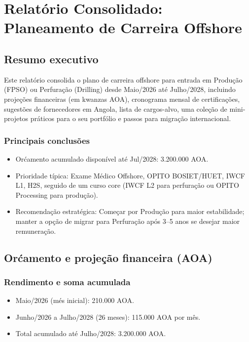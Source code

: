 \documentclass[11pt,openany]{book}
\begin{document}
\chapter*{Relat\'orio Consolidado: Planeamento de Carreira Offshore}

\section*{Resumo executivo}
Este relat\'orio consolida o plano de carreira offshore para entrada em Produ\c{c}\~ao (FPSO) ou Perfura\c{c}\~ao (Drilling) desde Maio/2026 at\'e Julho/2028, incluindo proje\c{c}\~oes financeiras (em kwanzas AOA), cronograma mensal de certifica\c{c}\~oes, sugest\~oes de fornecedores em Angola, lista de cargos-alvo, uma cole\c{c}\~ao de mini-projetos pr\'aticos para o seu portf\'olio e passos para migra\c{c}\~ao internacional.

\subsection*{Principais conclus\~oes}
\begin{itemize}
  \item Or\'camento acumulado dispon\'ivel at\'e Jul/2028: 3.200.000 AOA.
  \item Prioridade t\'ipica: Exame M\'edico Offshore, OPITO BOSIET/HUET, IWCF L1, H2S, seguido de um curso core (IWCF L2 para perfura\c{c}\~ao ou OPITO Processing para produ\c{c}\~ao).
  \item Recomenda\c{c}\~ao estrat\'egica: Come\c{c}ar por Produ\c{c}\~ao para maior estabilidade; manter a op\c{c}\~ao de migrar para Perfura\c{c}\~ao ap\'os 3--5 anos se desejar maior remunera\c{c}\~ao.
\end{itemize}

\section{Or\'camento e proje\c{c}\~ao financeira (AOA)}
\subsection{Rendimento e soma acumulada}
\begin{itemize}
  \item Maio/2026 (m\'es inicial): 210.000 AOA.
  \item Junho/2026 a Julho/2028 (26 meses): 115.000 AOA por m\^es.
  \item Total acumulado at\'e Julho/2028: 3.200.000 AOA.
\end{itemize}
\end{document}
